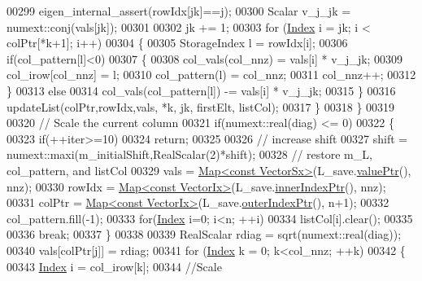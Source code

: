 \begin{DoxyCode}
00299           eigen\_internal\_assert(rowIdx[jk]==j);
00300           Scalar v\_j\_jk = numext::conj(vals[jk]);
00301 
00302           jk += 1;
00303           \textcolor{keywordflow}{for} (\hyperlink{namespace_eigen_a62e77e0933482dafde8fe197d9a2cfde}{Index} i = jk; i < colPtr[*k+1]; i++)
00304           \{
00305             StorageIndex l = rowIdx[i];
00306             \textcolor{keywordflow}{if}(col\_pattern[l]<0)
00307             \{
00308               col\_vals(col\_nnz) = vals[i] * v\_j\_jk;
00309               col\_irow[col\_nnz] = l;
00310               col\_pattern(l) = col\_nnz;
00311               col\_nnz++;
00312             \}
00313             \textcolor{keywordflow}{else}
00314               col\_vals(col\_pattern[l]) -= vals[i] * v\_j\_jk;
00315           \}
00316           updateList(colPtr,rowIdx,vals, *k, jk, firstElt, listCol);
00317         \}
00318       \}
00319 
00320       \textcolor{comment}{// Scale the current column}
00321       \textcolor{keywordflow}{if}(numext::real(diag) <= 0)
00322       \{
00323         \textcolor{keywordflow}{if}(++iter>=10)
00324           \textcolor{keywordflow}{return};
00325 
00326         \textcolor{comment}{// increase shift}
00327         shift = numext::maxi(m\_initialShift,RealScalar(2)*shift);
00328         \textcolor{comment}{// restore m\_L, col\_pattern, and listCol}
00329         vals = \hyperlink{group___core___module_class_eigen_1_1_map}{Map<const VectorSx>}(L\_save.\hyperlink{group___sparse_core___module_a9d4354d3f4d121d764bbed33cac05329}{valuePtr}(), nnz);
00330         rowIdx = \hyperlink{group___core___module_class_eigen_1_1_map}{Map<const VectorIx>}(L\_save.\hyperlink{group___sparse_core___module_ae7b804bd39745156d20ca1611a296b67}{innerIndexPtr}(), nnz);
00331         colPtr = \hyperlink{group___core___module_class_eigen_1_1_map}{Map<const VectorIx>}(L\_save.\hyperlink{group___sparse_core___module_a75506964d86d6badb32d0b4917acf2e2}{outerIndexPtr}(), n+1);
00332         col\_pattern.fill(-1);
00333         \textcolor{keywordflow}{for}(\hyperlink{namespace_eigen_a62e77e0933482dafde8fe197d9a2cfde}{Index} i=0; i<n; ++i)
00334           listCol[i].clear();
00335 
00336         \textcolor{keywordflow}{break};
00337       \}
00338 
00339       RealScalar rdiag = sqrt(numext::real(diag));
00340       vals[colPtr[j]] = rdiag;
00341       \textcolor{keywordflow}{for} (\hyperlink{namespace_eigen_a62e77e0933482dafde8fe197d9a2cfde}{Index} k = 0; k<col\_nnz; ++k)
00342       \{
00343         \hyperlink{namespace_eigen_a62e77e0933482dafde8fe197d9a2cfde}{Index} i = col\_irow[k];
00344         \textcolor{comment}{//Scale}

\end{DoxyCode}
